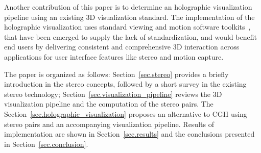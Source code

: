 Another contribution of this paper is to determine an holographic visualization pipeline using an existing 3D visualization standard. The implementation of the holographic visualization uses standard viewing and motion software toolkits~\cite{schreiner2004, Burns2004, Zhang2012}, that have been emerged to supply the lack of standardization, and would benefit end users by delivering consistent and comprehensive 3D interaction across applications for user interface features like stereo and motion capture.

The paper is organized as follows: Section~\ref{sec.stereo} provides a briefly introduction in the stereo concepts, followed by a short survey in the existing stereo technology; Section~\ref{sec.visualization_pipeline} reviews the 3D visualization pipeline and the computation of the stereo pairs. The Section~\ref{sec.holographic_visualization} proposes an alternative to CGH using stereo pairs and an accompanying visualization pipeline. Results of implementation are shown in Section~\ref{sec.results} and the conclusions presented in Section~\ref{sec.conclusion}.


